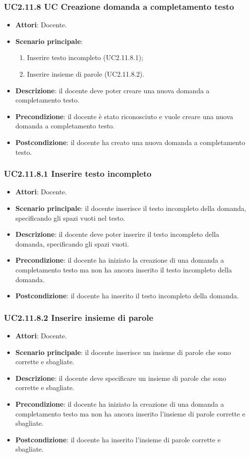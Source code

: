 \subsubsection{UC2.11.8 UC Creazione domanda a completamento testo}
\begin{itemize}
\item \textbf{Attori}: Docente.
\item \textbf{Scenario principale}:
\begin{enumerate}
\item Inserire testo incompleto (UC2.11.8.1);
\item Inserire insieme di parole (UC2.11.8.2).
\end{enumerate}
\item \textbf{Descrizione}: il docente deve poter creare una nuova domanda a completamento testo.
\item \textbf{Precondizione}: il docente è stato riconosciuto e vuole creare una nuova domanda a completamento testo.
\item \textbf{Postcondizione}: il docente ha creato una nuova domanda a completamento testo.
\end{itemize}
\subsubsection{UC2.11.8.1 Inserire testo incompleto}
\begin{itemize}
\item \textbf{Attori}: Docente.
\item \textbf{Scenario principale}: il docente inserisce il testo incompleto della domanda, specificando gli spazi vuoti nel testo.
\item \textbf{Descrizione}: il docente deve poter inserire il testo incompleto della domanda, specificando gli spazi vuoti.
\item \textbf{Precondizione}: il docente ha iniziato la creazione di una domanda a completamento testo ma non ha ancora inserito il testo incompleto della domanda.
\item \textbf{Postcondizione}: il docente ha inserito il testo incompleto della domanda.
\end{itemize}
\subsubsection{UC2.11.8.2 Inserire insieme di parole}
\begin{itemize}
\item \textbf{Attori}: Docente.
\item \textbf{Scenario principale}: il docente inserisce un insieme di parole che sono corrette e sbagliate.
\item \textbf{Descrizione}: il docente deve specificare un insieme di parole che sono corrette e sbagliate.
\item \textbf{Precondizione}:  il docente ha iniziato la creazione di una domanda a completamento testo ma non ha ancora inserito l'insieme di parole corrette e sbagliate.
\item \textbf{Postcondizione}: il docente ha inserito l'insieme di parole corrette e sbagliate.
\end{itemize}
